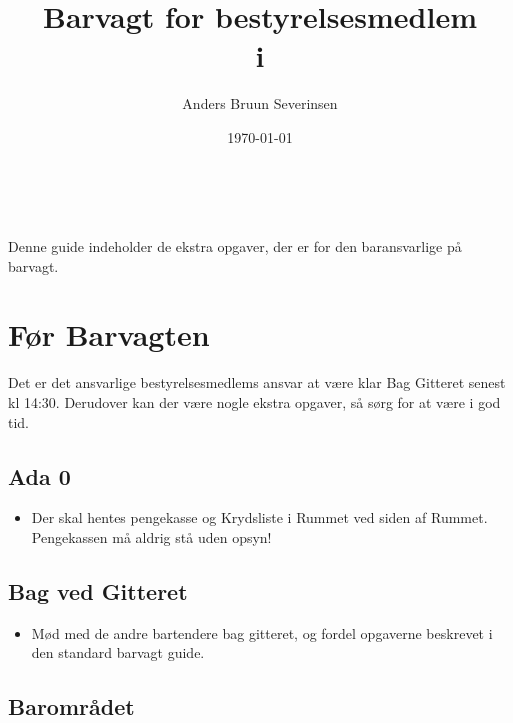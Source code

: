 

\title{Barvagt for bestyrelsesmedlem\\ i \fredagscafeen}
\date{\today}
\author{Anders Bruun Severinsen}



\maketitle

\tableofcontents \

Denne guide indeholder de ekstra opgaver, 
der er for den baransvarlige på barvagt.

\section{Før Barvagten}
\label{sec:pre-barvagten}

Det er det ansvarlige bestyrelsesmedlems ansvar at være klar Bag Gitteret senest kl 14:30.
Derudover kan der være nogle ekstra opgaver, så sørg for at være i god tid.

\subsection{Ada 0}
\label{sec:pre:ada}

\begin{itemize}
    \item Der skal hentes pengekasse og Krydsliste i Rummet ved siden af 
    Rummet. Pengekassen må aldrig stå uden opsyn!
\end{itemize}

\subsection{Bag ved Gitteret}
\label{sec:pre:bag-ved-gitteret}
\begin{itemize}
    \item Mød med de andre bartendere bag gitteret, og fordel opgaverne beskrevet i den standard barvagt guide.
\end{itemize}

\subsection{Barområdet}
\label{sec:pre:baromradet}

